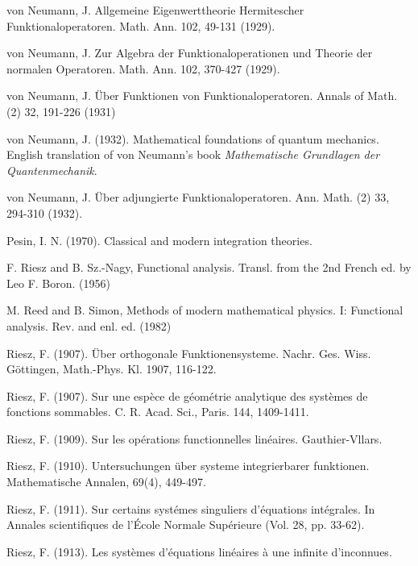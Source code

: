 \documentclass[12pt,b5paper,notitlepage]{article}
\theoremstyle{definition}
\theoremstyle{plain}
\numberwithin{equation}{section}
\begin{document}
\begin{thebibliography}{999999}
von Neumann, J. Allgemeine Eigenwerttheorie Hermitescher Funktionaloperatoren. Math. Ann. 102, 49-131 (1929).


von Neumann, J. Zur Algebra der Funktionaloperationen und Theorie der normalen Operatoren. Math. Ann. 102, 370-427 (1929).



von Neumann, J. \"Uber Funktionen von Funktionaloperatoren. Annals of Math. (2) 32, 191-226 (1931)


von Neumann, J. (1932). Mathematical foundations of quantum mechanics. English translation of von Neumann's book \textit{Mathematische Grundlagen der Quantenmechanik}.



von Neumann, J. {\"U}ber adjungierte {Funktionaloperatoren}. Ann. Math. (2) 33, 294-310 (1932).



Pesin, I. N. (1970). Classical and modern integration theories.


F. Riesz and B. Sz.-Nagy, Functional analysis. Transl. from the 2nd French ed. by Leo F.
Boron. (1956)

M. Reed and B. Simon, Methods of modern mathematical physics. {I}: {Functional} analysis. {Rev}. and enl. ed. (1982)

Riesz, F. (1907). \"Uber orthogonale Funktionensysteme. Nachr. Ges. Wiss. G{\"o}ttingen, Math.-Phys. Kl.  1907, 116-122.


Riesz, F. (1907). Sur une esp{\`e}ce de g{\'e}om{\'e}trie analytique des syst{\`e}mes de fonctions sommables. C. R. Acad. Sci., Paris.  144, 1409-1411.



Riesz, F. (1909). Sur les op\'erations functionnelles lin\'eaires. Gauthier-Vllars.

Riesz, F. (1910). Untersuchungen \"uber systeme integrierbarer funktionen. Mathematische Annalen, 69(4), 449-497.


Riesz, F. (1911). Sur certains syst\'emes singuliers d'\'equations int\'egrales. In Annales scientifiques de l'\'Ecole Normale Sup\'erieure (Vol. 28, pp. 33-62).

Riesz, F. (1913). Les syst\`emes d'\'equations lin\'eaires \`a une infinite d'inconnues.



\end{thebibliography}
\end{document}

